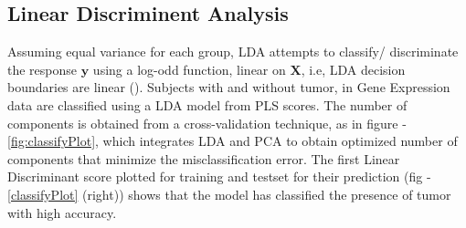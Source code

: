 \documentclass[10pt, a4paper]{article}\usepackage[]{graphicx}\usepackage[]{color}
\begin{document}
\subsection{Linear Discriminent Analysis}
Assuming equal variance for each group, LDA attempts to classify/ discriminate the response $\mathbf{y}$ using a log-odd function, linear on $\mathbf{X}$, i.e, LDA decision boundaries are linear (\cite{friedman2001elements}). Subjects with and without tumor, in Gene Expression data are classified using a LDA model from PLS scores. The number of components is obtained from a cross-validation technique, as in figure - \ref{fig:classifyPlot}, which integrates LDA and PCA to obtain optimized number of components that minimize the misclassification error. The first Linear Discriminant score plotted for training and testset for their prediction (fig - \ref{classifyPlot} (right)) shows that the model has classified the presence of tumor with high accuracy.
\end{document}

